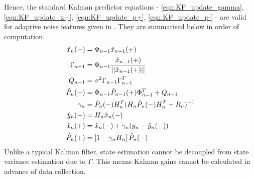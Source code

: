 Hence, the standard Kalman predictor equations - \ref{eqn:KF_update_gamma}, \ref{eqn:KF_update_x+}, \ref{eqn:KF_update_p+}, \ref{eqn:KF_update_p-} - are valid for adaptive noise features given in \cite{liska}. They are summarised below in order of computation. 
\begin{align}
\hat{x}_{n}(-) & = \Phi_{n-1} \hat{x}_{n-1}(+) \\
\Gamma_{n-1} &=\Phi_{n-1}\frac{\hat{x}_{n-1}(+)}{||\hat{x}_{n-1}(+)||} \\
Q_{n-1} & = \sigma^2 \Gamma_{n-1}\Gamma_{n-1}^T \\
\hat{P}_{n}(-)&= \Phi_{n-1} \hat{P}_{n-1}(+) \Phi_{n-1}^T + Q_{n-1} \\
\gamma_n &= \hat{P}_{n}(-) H_n^T(H_n\hat{P}_{n}(-)H_n^T + R_n)^{-1} \\
\hat{y}_n(-) & = H_n \hat{x}_{n}(-) \\
\hat{x}_{n}(+) &= \hat{x}_{n}(-) + \gamma_n (y_n - \hat{y}_n(-)) \\
\hat{P}_{n}(+) &= \left[1  - \gamma_n H_n \right] \hat{P}_{n}(-)
\end{align}
Unlike a typical Kalman filter, state estimation cannot be decoupled from state variance estimation due to $\Gamma$. This means Kalman gains cannot be calculated in advance of data collection.

